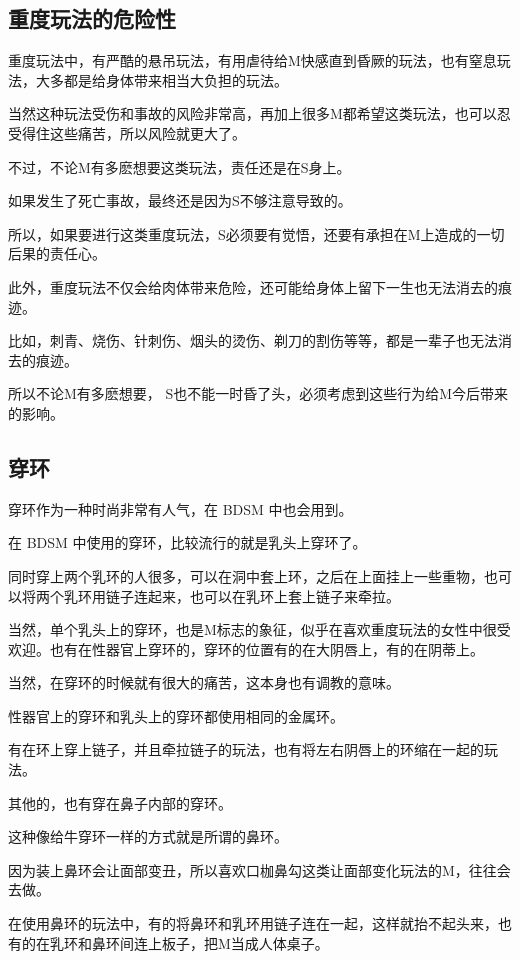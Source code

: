 \documentclass[12pt,UTF8]{ctexbook}
\begin{document}
\subsection{重度玩法的危险性}

重度玩法中，有严酷的悬吊玩法，有用虐待给M快感直到昏厥的玩法，也有窒息玩法，大多都是给身体带来相当大负担的玩法。

当然这种玩法受伤和事故的风险非常高，再加上很多M都希望这类玩法，也可以忍受得住这些痛苦，所以风险就更大了。

不过，不论M有多麽想要这类玩法，责任还是在S身上。

如果发生了死亡事故，最终还是因为S不够注意导致的。

所以，如果要进行这类重度玩法，S必须要有觉悟，还要有承担在M上造成的一切后果的责任心。

此外，重度玩法不仅会给肉体带来危险，还可能给身体上留下一生也无法消去的痕迹。

比如，刺青、烧伤、针刺伤、烟头的烫伤、剃刀的割伤等等，都是一辈子也无法消去的痕迹。

所以不论M有多麽想要， S也不能一时昏了头，必须考虑到这些行为给M今后带来的影响。

\subsection{穿环}

穿环作为一种时尚非常有人气，在 BDSM 中也会用到。

在 BDSM 中使用的穿环，比较流行的就是乳头上穿环了。

同时穿上两个乳环的人很多，可以在洞中套上环，之后在上面挂上一些重物，也可以将两个乳环用链子连起来，也可以在乳环上套上链子来牵拉。

当然，单个乳头上的穿环，也是M标志的象征，似乎在喜欢重度玩法的女性中很受欢迎。也有在性器官上穿环的，穿环的位置有的在大阴唇上，有的在阴蒂上。

当然，在穿环的时候就有很大的痛苦，这本身也有调教的意味。

性器官上的穿环和乳头上的穿环都使用相同的金属环。

有在环上穿上链子，并且牵拉链子的玩法，也有将左右阴唇上的环缩在一起的玩法。

其他的，也有穿在鼻子内部的穿环。

这种像给牛穿环一样的方式就是所谓的鼻环。

因为装上鼻环会让面部变丑，所以喜欢口枷鼻勾这类让面部变化玩法的M，往往会去做。

在使用鼻环的玩法中，有的将鼻环和乳环用链子连在一起，这样就抬不起头来，也有的在乳环和鼻环间连上板子，把M当成人体桌子。
\end{document}
